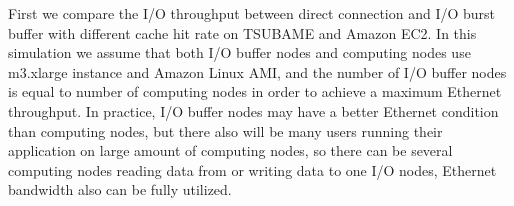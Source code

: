 	


First we compare the I/O throughput between direct connection and I/O burst buffer with different cache hit rate on TSUBAME and Amazon EC2.
In this simulation we assume that both I/O buffer nodes and computing nodes use m3.xlarge instance and Amazon Linux AMI, and the number of I/O buffer nodes is equal to number of computing nodes in order to achieve a maximum Ethernet throughput.
In practice, I/O buffer nodes may have a better Ethernet condition than computing nodes, but there also will be many users running their application on large amount of computing nodes, so there can be several computing nodes reading data from or writing data to one I/O nodes, Ethernet bandwidth also can be fully utilized. 

